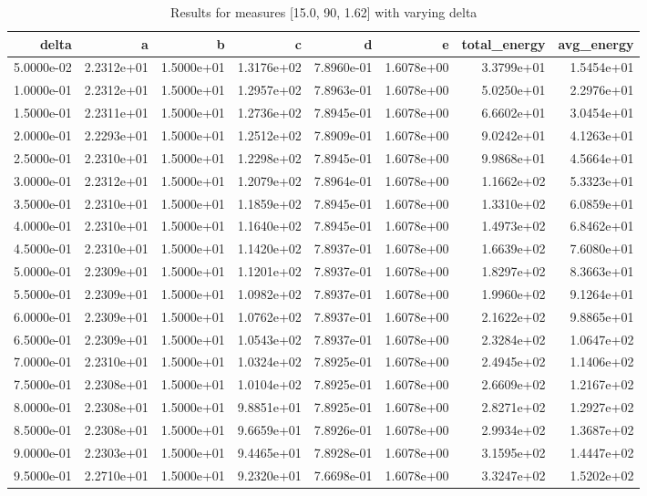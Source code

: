 \begin{table}
\caption{Results for measures [15.0, 90, 1.62] with varying delta}
\label{tab:results_15.0_90_1.62}
\begin{tabular}{rrrrrrrr}
\toprule
delta & a & b & c & d & e & total_energy & avg_energy \\
\midrule
5.0000e-02 & 2.2312e+01 & 1.5000e+01 & 1.3176e+02 & 7.8960e-01 & 1.6078e+00 & 3.3799e+01 & 1.5454e+01 \\
1.0000e-01 & 2.2312e+01 & 1.5000e+01 & 1.2957e+02 & 7.8963e-01 & 1.6078e+00 & 5.0250e+01 & 2.2976e+01 \\
1.5000e-01 & 2.2311e+01 & 1.5000e+01 & 1.2736e+02 & 7.8945e-01 & 1.6078e+00 & 6.6602e+01 & 3.0454e+01 \\
2.0000e-01 & 2.2293e+01 & 1.5000e+01 & 1.2512e+02 & 7.8909e-01 & 1.6078e+00 & 9.0242e+01 & 4.1263e+01 \\
2.5000e-01 & 2.2310e+01 & 1.5000e+01 & 1.2298e+02 & 7.8945e-01 & 1.6078e+00 & 9.9868e+01 & 4.5664e+01 \\
3.0000e-01 & 2.2312e+01 & 1.5000e+01 & 1.2079e+02 & 7.8964e-01 & 1.6078e+00 & 1.1662e+02 & 5.3323e+01 \\
3.5000e-01 & 2.2310e+01 & 1.5000e+01 & 1.1859e+02 & 7.8945e-01 & 1.6078e+00 & 1.3310e+02 & 6.0859e+01 \\
4.0000e-01 & 2.2310e+01 & 1.5000e+01 & 1.1640e+02 & 7.8945e-01 & 1.6078e+00 & 1.4973e+02 & 6.8462e+01 \\
4.5000e-01 & 2.2310e+01 & 1.5000e+01 & 1.1420e+02 & 7.8937e-01 & 1.6078e+00 & 1.6639e+02 & 7.6080e+01 \\
5.0000e-01 & 2.2309e+01 & 1.5000e+01 & 1.1201e+02 & 7.8937e-01 & 1.6078e+00 & 1.8297e+02 & 8.3663e+01 \\
5.5000e-01 & 2.2309e+01 & 1.5000e+01 & 1.0982e+02 & 7.8937e-01 & 1.6078e+00 & 1.9960e+02 & 9.1264e+01 \\
6.0000e-01 & 2.2309e+01 & 1.5000e+01 & 1.0762e+02 & 7.8937e-01 & 1.6078e+00 & 2.1622e+02 & 9.8865e+01 \\
6.5000e-01 & 2.2309e+01 & 1.5000e+01 & 1.0543e+02 & 7.8937e-01 & 1.6078e+00 & 2.3284e+02 & 1.0647e+02 \\
7.0000e-01 & 2.2310e+01 & 1.5000e+01 & 1.0324e+02 & 7.8925e-01 & 1.6078e+00 & 2.4945e+02 & 1.1406e+02 \\
7.5000e-01 & 2.2308e+01 & 1.5000e+01 & 1.0104e+02 & 7.8925e-01 & 1.6078e+00 & 2.6609e+02 & 1.2167e+02 \\
8.0000e-01 & 2.2308e+01 & 1.5000e+01 & 9.8851e+01 & 7.8925e-01 & 1.6078e+00 & 2.8271e+02 & 1.2927e+02 \\
8.5000e-01 & 2.2308e+01 & 1.5000e+01 & 9.6659e+01 & 7.8926e-01 & 1.6078e+00 & 2.9934e+02 & 1.3687e+02 \\
9.0000e-01 & 2.2303e+01 & 1.5000e+01 & 9.4465e+01 & 7.8928e-01 & 1.6078e+00 & 3.1595e+02 & 1.4447e+02 \\
9.5000e-01 & 2.2710e+01 & 1.5000e+01 & 9.2320e+01 & 7.6698e-01 & 1.6078e+00 & 3.3247e+02 & 1.5202e+02 \\
\bottomrule
\end{tabular}
\end{table}
